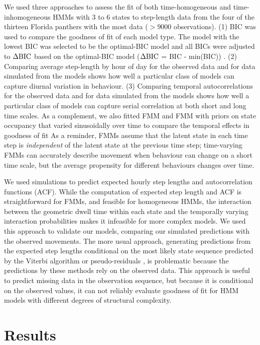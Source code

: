 \documentclass{bmcart}
\newcommand{\dbic}{\ensuremath \Delta \textrm{BIC}}
\begin{document}
We used three approaches to assess the fit of both time-homogeneous and time-inhomogeneous 
HMMs with 3 to 6 states to step-length data from the four of the thirteen Florida panthers 
with the most data ($> 9000 $ observations). (1) BIC was used to compare the goodness of fit of each model type. The model with the lowest BIC was selected to be the optimal-BIC model and all BICs were adjusted to $\dbic$ based on the optimal-BIC model ($\dbic$ = BIC - min(BIC)) . (2) Comparing average step-length by hour of day for the 
observed data and for data simulated from the models shows how well a particular class of 
models can capture diurnal variation in behaviour. (3) Comparing temporal autocorrelations
for the observed data and for data simulated from the models shows how well a particular class
of models can capture serial correlation at both short and long time scales. As a complement, we also fitted FMM and FMM with priors on state occupancy that varied sinusoidally over time to compare the temporal effects in goodness of fit As a reminder, FMMs assume that the latent state in each time step is \emph{independent} of the latent state at the previous time step; time-varying FMMs can accurately describe movement when behaviour can
change on a short time scale, but the average propensity for different
behaviours changes over time.

We used simulations to predict expected hourly step lengths and
autocorrelation functions (ACF).  While the computation of expected
step length and ACF is straightforward for FMMs, and feasible for
homogeneous HMMs, the interaction between the geometric dwell time
within each state and the temporally varying interaction probabilities
makes it infeasible for more complex models.  We used this approach to
validate our models, comparing our simulated predictions with the
observed movements.  The more usual approach, generating predictions
from the expected step lengths conditional on the most likely state
sequence predicted by the Viterbi algorithm or pseudo-residuals \cite{zucchini_hidden_2009,langrock_flexible_2012}, is problematic
because the predictions by these methods rely on the observed data. 
This approach is useful to predict
missing data in the observation sequence, but because it is
conditional on the observed values, it can not reliably evaluate
goodness of fit for HMM models with
different degrees of structural complexity.

\section*{Results}
\end{document}
